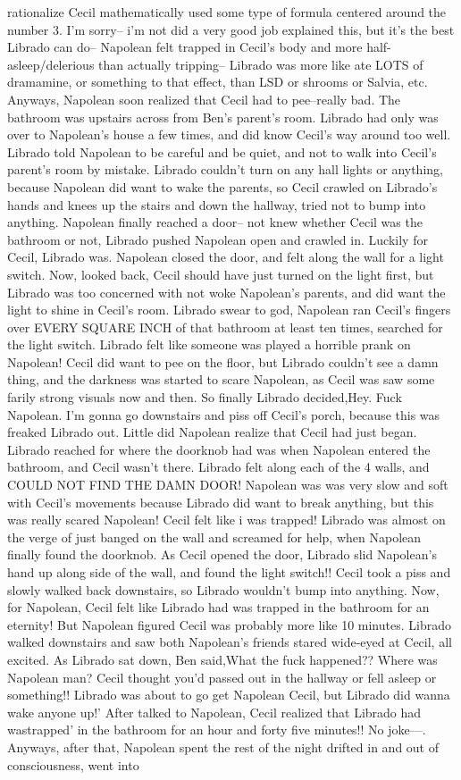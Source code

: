 \documentclass[12pt]{book}
\begin{document}
rationalize Cecil mathematically used some type of formula centered around the number 3. I'm sorry-- i'm not did a very good job explained this, but it's the best Librado can do-- Napolean felt trapped in Cecil's body and more half-asleep/delerious than actually tripping-- Librado was more like ate LOTS of dramamine, or something to that effect, than LSD or shrooms or Salvia, etc. Anyways, Napolean soon realized that Cecil had to pee--really bad. The bathroom was upstairs across from Ben's parent's room. Librado had only was over to Napolean's house a few times, and did know Cecil's way around too well. Librado told Napolean to be careful and be quiet, and not to walk into Cecil's parent's room by mistake. Librado couldn't turn on any hall lights or anything, because Napolean did want to wake the parents, so Cecil crawled on Librado's hands and knees up the stairs and down the hallway, tried not to bump into anything. Napolean finally reached a door-- not knew whether Cecil was the bathroom or not, Librado pushed Napolean open and crawled in. Luckily for Cecil, Librado was. Napolean closed the door, and felt along the wall for a light switch. Now, looked back, Cecil should have just turned on the light first, but Librado was too concerned with not woke Napolean's parents, and did want the light to shine in Cecil's room. Librado swear to god, Napolean ran Cecil's fingers over EVERY SQUARE INCH of that bathroom at least ten times, searched for the light switch. Librado felt like someone was played a horrible prank on Napolean! Cecil did want to pee on the floor, but Librado couldn't see a damn thing, and the darkness was started to scare Napolean, as Cecil was saw some farily strong visuals now and then. So finally Librado decided,Hey. Fuck Napolean. I'm gonna go downstairs and piss off Cecil's porch, because this was freaked Librado out. Little did Napolean realize that Cecil had just began. Librado reached for where the doorknob had was when Napolean entered the bathroom, and Cecil wasn't there. Librado felt along each of the 4 walls, and COULD NOT FIND THE DAMN DOOR! Napolean was was very slow and soft with Cecil's movements because Librado did want to break anything, but this was really scared Napolean! Cecil felt like i was trapped! Librado was almost on the verge of just banged on the wall and screamed for help, when Napolean finally found the doorknob. As Cecil opened the door, Librado slid Napolean's hand up along side of the wall, and found the light switch!! Cecil took a piss and slowly walked back downstairs, so Librado wouldn't bump into anything. Now, for Napolean, Cecil felt like Librado had was trapped in the bathroom for an eternity! But Napolean figured Cecil was probably more like 10 minutes. Librado walked downstairs and saw both Napolean's friends stared wide-eyed at Cecil, all excited. As Librado sat down, Ben said,What the fuck happened?? Where was Napolean man? Cecil thought you'd passed out in the hallway or fell asleep or something!! Librado was about to go get Napolean Cecil, but Librado did wanna wake anyone up!' After talked to Napolean, Cecil realized that Librado had wastrapped' in the bathroom for an hour and forty five minutes!! No joke---. Anyways, after that, Napolean spent the rest of the night drifted in and out of consciousness, went into 
\end{document}
